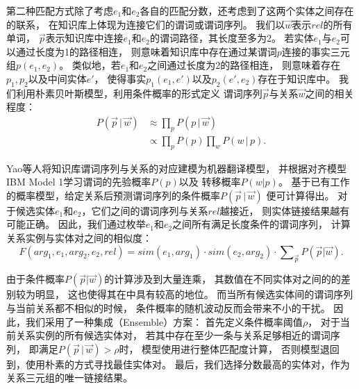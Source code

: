 第二种匹配方式除了考虑$e_1$和$e_2$各自的匹配分数，还考虑到了这两个实体之间存在的联系，
在知识库上体现为连接它们的谓词或谓词序列。
我们以$\vec{w}$表示$rel$的所有单词，
$\vec{p}$表示知识库中连接$e_1$和$e_2$的谓词路径，其长度至多为2。
若实体$e_1$与$e_2$可以通过长度为1的路径相连，
则意味着知识库中存在通过某谓词$p$连接的事实三元组$p(e_1, e_2)$。
类似地，若$e_1$和$e_2$之间通过长度为2的路径相连，
则意味着存在$p_1, p_2$以及中间实体$e'$，
使得事实$p_1(e_1, e')$以及$p_2(e', e_2)$存在于知识库中。
我们利用朴素贝叶斯模型，利用条件概率的形式定义
谓词序列$\vec{p}$与关系$\vec{w}$之间的相关程度：
\begin{equation}
\begin{aligned}
    P(\vec{p}\, |\, \vec{w}) & \approx \prod\nolimits_p P(p\, |\, \vec{w})  \\
                        & \propto \prod\nolimits_p P(p) \prod\nolimits_w P(w\, |\, p).
\end{aligned}
\end{equation}

Yao等人\cite{yao2014information}将知识库谓词序列与关系的对应建模为机器翻译模型，
并根据对齐模型IBM Model 1\cite{brown1993mathematics}学习谓词的先验概率$P(p)$以及
转移概率$P(w|p)$。
基于已有工作的概率模型，给定关系后预测谓词序列的条件概率$P(\vec{p}\, |\, \vec{w})$
便可计算得出。
对于候选实体$e_1$和$e_2$，它们之间的谓词序列与关系$rel$越接近，
则实体链接结果越有可能正确。
因此，我们通过枚举$e_1$和$e_2$之间所有满足长度条件的谓词序列，
计算关系实例与实体对之间的相似度：
\begin{equation}
    \label{eqn:full}
    F(arg_1, e_1, arg_2, e_2, rel) = sim(e_1, arg_1) \cdot
               sim(e_2, arg_2) \cdot
		\sum\nolimits_{\vec{p}} P(\vec{p} | \vec{w}).
\end{equation}

由于条件概率$P(\vec{p} | \vec{w})$的计算涉及到大量连乘，
其数值在不同实体对之间的的差别较为明显，
这也使得其在中具有较高的地位。
而当所有候选实体间的谓词序列与当前关系都不相似的时候，
条件概率的随机波动反而会带来不小的干扰。
因此，我们采用了一种集成（Ensemble）方案：
首先定义条件概率阈值$\rho$，
对于当前关系实例的所有候选实体对，
若其中存在至少一条与关系足够相近的谓词序列，
即满足$P(\vec{p}\, |\, \vec{w}) > \rho$时，
模型使用进行整体匹配度计算，
否则模型退回到，使用朴素的方式寻找最佳实体对。
最后，我们选择分数最高的实体对，作为关系三元组的唯一链接结果。




